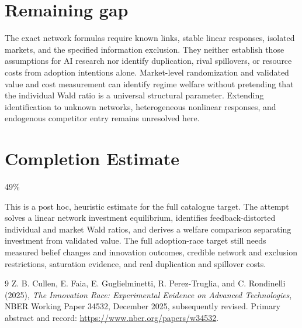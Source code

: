 \documentclass[11pt]{article}
\theoremstyle{definition}
\begin{document}
\section*{Remaining gap}
The exact network formulas require known links, stable linear responses,
isolated markets, and the specified information exclusion. They neither
establish those assumptions for AI research nor identify duplication,
rival spillovers, or resource costs from adoption intentions alone.
Market-level randomization and validated value and cost measurement can
identify regime welfare without pretending that the individual Wald
ratio is a universal structural parameter. Extending identification to
unknown networks, heterogeneous nonlinear responses, and endogenous
competitor entry remains unresolved here.

\section{Completion Estimate}
49\%

This is a post hoc, heuristic estimate for the full catalogue target.
The attempt solves a linear network investment equilibrium, identifies feedback-distorted individual and market Wald ratios, and derives a welfare comparison separating investment from validated value. The full adoption-race target still needs measured belief changes and innovation outcomes, credible network and exclusion restrictions, saturation evidence, and real duplication and spillover costs.

\begin{thebibliography}{9}
 Z. B. Cullen, E. Faia, E. Guglielminetti,
R. Perez-Truglia, and C. Rondinelli (2025), \emph{The Innovation Race:
Experimental Evidence on Advanced Technologies}, NBER Working Paper
34532, December 2025, subsequently revised. Primary abstract and record:
\url{https://www.nber.org/papers/w34532}.
\end{thebibliography}
\end{document}
